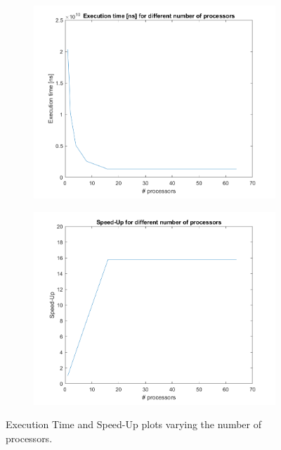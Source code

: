 \documentclass[12pt, a4paper]{article}
\begin{document}
\begin{figure}[H]
\hspace{-0.5cm}
\begin{subfigure}{.5\textwidth}
  \centering
  \includegraphics[width=1.10\linewidth]{./images/S1_plots/execution_time_line}
  
\end{subfigure}%
\begin{subfigure}{.5\textwidth}
  \centering
  \includegraphics[width=1.10\linewidth]{./images/S1_plots/speedup_line}

\end{subfigure}
\caption{Execution Time and Speed-Up plots varying the number of processors.}
\end{figure}
\end{document}

